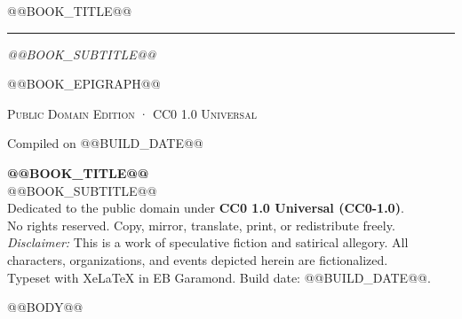 \documentclass[11pt,openany,oneside]{book}
\begin{document}
\frontmatter
\begin{titlepage}
  \centering
  \vspace*{3.2cm}
  {\Huge @@BOOK_TITLE@@\par}
  \vspace{1.1em}
  {\color{RuleGray}\rule{4.5cm}{0.5pt}\par}
  \vspace{1.1em}
  {\large\itshape\color{Muted} @@BOOK_SUBTITLE@@\par}
  \vfill
  {\small\color{Muted} @@BOOK_EPIGRAPH@@\par}
  \vspace{2.4cm}
  {\small\scshape\color{Muted} Public Domain Edition · CC0 1.0 Universal\par}
  \vspace{0.6em}
  {\footnotesize\color{Muted} Compiled on @@BUILD_DATE@@\par}
\end{titlepage}

\thispagestyle{empty}
\vspace*{\fill}
\begin{flushleft}
\footnotesize\color{Muted}
\textbf{@@BOOK_TITLE@@}\\
@@BOOK_SUBTITLE@@\\[1em]
Dedicated to the public domain under \textbf{CC0 1.0 Universal (CC0-1.0)}.\\
No rights reserved. Copy, mirror, translate, print, or redistribute freely.\\[1em]
\textit{Disclaimer:} This is a work of speculative fiction and satirical allegory.
All characters, organizations, and events depicted herein are fictionalized.\\[1em]
Typeset with XeLaTeX in EB Garamond. Build date: @@BUILD_DATE@@.
\end{flushleft}
\clearpage

\tableofcontents
\clearpage

\mainmatter
@@BODY@@
\end{document}
